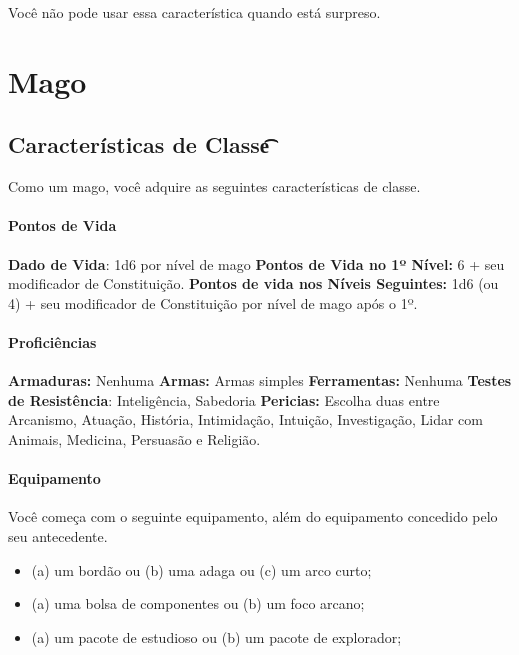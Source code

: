 \documentclass{RPG_Adventure}[2021/10/20]
\begin{document}
Você não pode usar essa característica quando está surpreso.


\chapter{Mago}%
\label{cha:mago}

\section*{Características de Classe\t\t}%
\label{sec:caracteristicas_de_classe}

Como um mago, você adquire as seguintes características de classe.

\subsubsection{Pontos de Vida}%
\label{ssub:pontos_de_vida}

\textbf{Dado de Vida}: 1d6 por nível de mago \nl
\textbf{Pontos de Vida no 1º Nível:} 6 + seu modificador de Constituição. \nl
\textbf{Pontos de vida nos Níveis Seguintes:} 1d6 (ou 4) + seu modificador de
Constituição por nível de mago após o 1º.

\subsubsection{Proficiências}%
\label{ssub:proficiencias}

\textbf{Armaduras:} Nenhuma \nl
\textbf{Armas:} Armas simples \nl
\textbf{Ferramentas:} Nenhuma \jump
\textbf{Testes de Resistência}: Inteligência, Sabedoria \nl
\textbf{Pericias:} Escolha duas entre Arcanismo, Atuação, História, Intimidação,
Intuição, Investigação, Lidar com Animais, Medicina, Persuasão e Religião.

\subsubsection{Equipamento}%
\label{ssub:equipamento}

Você começa com o seguinte equipamento, além do equipamento concedido pelo seu
antecedente.
\begin{itemize}
    \item (a) um bordão ou (b) uma adaga ou (c) um arco curto;
    \item (a) uma bolsa de componentes ou (b) um foco arcano;
    \item (a) um pacote de estudioso ou (b) um pacote de explorador;
\end{itemize}
\end{document}
